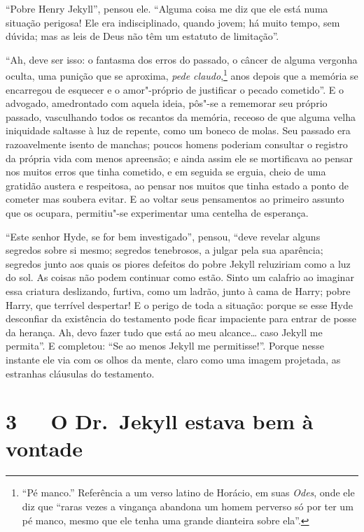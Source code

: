 “Pobre Henry Jekyll”, pensou ele.  “Alguma coisa me diz que ele está
numa situação perigosa!  Ele era indisciplinado, quando jovem; há muito
tempo, sem dúvida; mas as leis de Deus não têm um estatuto de
limitação”.  

“Ah, deve ser isso: o fantasma dos erros do passado, o câncer de alguma
vergonha oculta, uma punição que se aproxima, \textit{pede claudo},\footnote{
“Pé manco.” Referência a um verso latino de Horácio, em suas \textit{Odes}, onde
ele diz que “raras vezes a vingança abandona um homem perverso só por
ter um pé manco, mesmo que ele tenha uma grande dianteira sobre ela”.}
anos depois que a memória se encarregou de esquecer e o
amor"-próprio de justificar o pecado cometido”.  E o advogado,
amedrontado com aquela ideia, pôs"-se a rememorar seu próprio passado,
vasculhando todos os recantos da memória, receoso de que alguma velha
iniquidade saltasse à luz de repente, como um boneco de molas.  Seu
passado era razoavelmente isento de manchas; poucos homens poderiam
consultar o registro da própria vida com menos apreensão; e ainda assim
ele se mortificava ao pensar nos muitos erros que tinha cometido, e em
seguida se erguia, cheio de uma gratidão austera e respeitosa, ao
pensar nos muitos que tinha estado a ponto de cometer mas soubera
evitar.  E ao voltar seus pensamentos ao primeiro assunto que os
ocupara, permitiu"-se experimentar uma centelha de esperança.

“Este senhor Hyde, se for bem investigado”, pensou, “deve revelar alguns
segredos sobre si mesmo; segredos tenebrosos, a julgar pela sua
aparência; segredos junto aos quais os piores defeitos do pobre Jekyll
reluziriam como a luz do sol.  As coisas não podem continuar como
estão. Sinto um calafrio ao imaginar essa criatura deslizando, furtiva,
como um ladrão, junto à cama de Harry; pobre Harry, que terrível
despertar! E o perigo de toda a situação: porque se esse Hyde
desconfiar da existência do testamento pode ficar impaciente para
entrar de posse da herança.  Ah, devo fazer tudo que está ao meu
alcance\ldots{} caso Jekyll me permita”.  E completou: “Se ao menos Jekyll
me permitisse!”.  Porque nesse instante ele via com os olhos da mente,
claro como uma imagem projetada, as estranhas cláusulas do testamento.


\chapter[3\ \ \ O Dr.~Jekyll estava bem à vontade]{3\ \ \ O Dr.~Jekyll estava bem à vontade}

